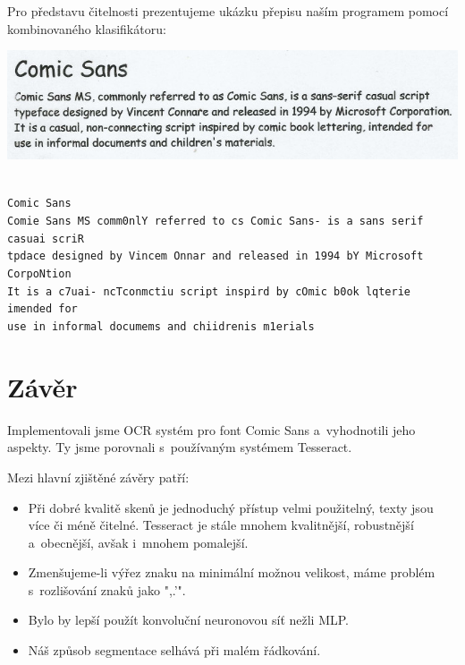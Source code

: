 \documentclass[12pt]{article}
\begin{document}
Pro představu čitelnosti prezentujeme ukázku přepisu naším programem pomocí kombinovaného klasifikátoru:

{
\centering
\includegraphics[width=14cm,keepaspectratio]{example.jpg}
}

{\tt\footnotesize ~\\
Comic Sans\\
Comie Sans MS comm0nlY referred to cs Comic Sans- is a sans serif casuai scriR\\
tpdace designed by Vincem Onnar and released in 1994 bY Microsoft CorpoNtion\\
It is a c7uai- ncTconmctiu script inspird by cOmic b0ok lqterie imended for\\
use in informal documems and chiidrenis m1erials\\
}


\section{Závěr}

Implementovali jsme OCR systém pro font Comic Sans a~vyhodnotili jeho aspekty. Ty jsme porovnali s~používaným systémem Tesseract.

Mezi hlavní zjištěné závěry patří:

\begin{itemize}
  \item Při dobré kvalitě skenů je jednoduchý přístup velmi použitelný, texty jsou více či méně čitelné. Tesseract je stále mnohem kvalitnější, robustnější a~obecnější, avšak i~mnohem pomalejší.
  \item Zmenšujeme-li výřez znaku na minimální možnou velikost, máme problém s~rozlišování znaků jako ",.'".
  \item Bylo by lepší použít konvoluční neuronovou síť nežli MLP.
  \item Náš způsob segmentace selhává při malém řádkování.
\end{itemize}


\begin{flushleft}
  
\end{flushleft}

\end{document}
